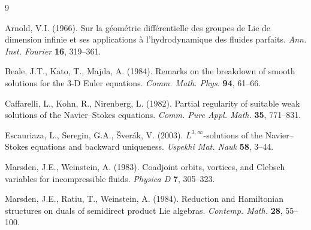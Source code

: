 \documentclass[11pt,a4paper]{article}
\begin{document}
\begin{thebibliography}{9}

Arnold, V.I. (1966). Sur la géométrie différentielle des groupes de Lie de dimension infinie et ses applications à l'hydrodynamique des fluides parfaits. \textit{Ann. Inst. Fourier} \textbf{16}, 319--361.

Beale, J.T., Kato, T., Majda, A. (1984). Remarks on the breakdown of smooth solutions for the 3-D Euler equations. \textit{Comm. Math. Phys.} \textbf{94}, 61--66.

Caffarelli, L., Kohn, R., Nirenberg, L. (1982). Partial regularity of suitable weak solutions of the Navier--Stokes equations. \textit{Comm. Pure Appl. Math.} \textbf{35}, 771--831.

Escauriaza, L., Seregin, G.A., Šverák, V. (2003). \(L^{3,\infty}\)-solutions of the Navier--Stokes equations and backward uniqueness. \textit{Uspekhi Mat. Nauk} \textbf{58}, 3--44.

Marsden, J.E., Weinstein, A. (1983). Coadjoint orbits, vortices, and Clebsch variables for incompressible fluids. \textit{Physica D} \textbf{7}, 305--323.

Marsden, J.E., Ratiu, T., Weinstein, A. (1984). Reduction and Hamiltonian structures on duals of semidirect product Lie algebras. \textit{Contemp. Math.} \textbf{28}, 55--100.

\end{thebibliography}
\end{document}
